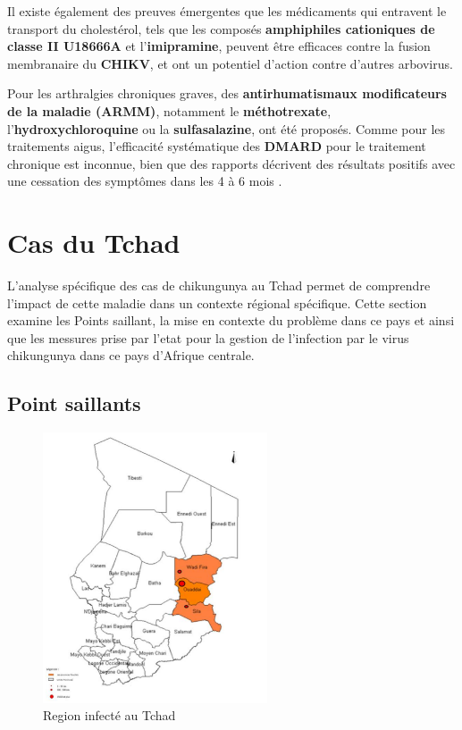 Il existe également des preuves émergentes que les médicaments qui entravent le transport du cholestérol, tels que les composés \textbf{amphiphiles cationiques de classe II U18666A} et l'\textbf{imipramine}, peuvent être efficaces contre la fusion membranaire du \textbf{CHIKV}, et ont un potentiel d'action contre d'autres arbovirus.

Pour les arthralgies chroniques graves, des \textbf{antirhumatismaux modificateurs de la maladie (ARMM)}, notamment le \textbf{méthotrexate}, l'\textbf{hydroxychloroquine} ou la \textbf{sulfasalazine}, ont été proposés. Comme pour les traitements aigus, l'efficacité systématique des \textbf{DMARD} pour le traitement chronique est inconnue, bien que des rapports décrivent des résultats positifs avec une cessation des symptômes dans les 4 à 6 mois \cite{ganesan2017chikungunya}.

\section{Cas du Tchad}

L'analyse spécifique des cas de chikungunya au Tchad permet de comprendre l'impact de cette maladie dans un contexte régional spécifique. Cette section examine les Points saillant, la mise en contexte du problème dans ce pays et ainsi que les messures prise par l'etat pour la gestion de l'infection par le virus chikungunya dans ce pays d'Afrique centrale.

\subsection{Point saillants}
\begin{figure}[!h]
	\begin{center}
		\includegraphics[height=8cm]{images/chadmap}
	\end{center}
	\caption{Region infecté au Tchad}
	\label{fig:chikvintchadmap}
\end{figure}

